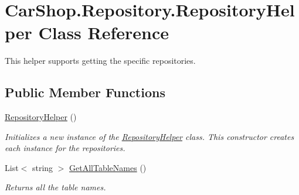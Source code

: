 \hypertarget{class_car_shop_1_1_repository_1_1_repository_helper}{}\section{Car\+Shop.\+Repository.\+Repository\+Helper Class Reference}
\label{class_car_shop_1_1_repository_1_1_repository_helper}


This helper supports getting the specific repositories.  


\subsection*{Public Member Functions}
\begin{DoxyCompactItemize}
\item 
\mbox{\hyperlink{class_car_shop_1_1_repository_1_1_repository_helper_ab5aa4d9a33d9b1859e1a4ab5aa4ab974}{Repository\+Helper}} ()
\begin{DoxyCompactList}\small\item\em Initializes a new instance of the \mbox{\hyperlink{class_car_shop_1_1_repository_1_1_repository_helper}{Repository\+Helper}} class. This constructor creates each instance for the repositories. \end{DoxyCompactList}\item 
List$<$ string $>$ \mbox{\hyperlink{class_car_shop_1_1_repository_1_1_repository_helper_abe7dec93c7555aa6630f7212ca2dd714}{Get\+All\+Table\+Names}} ()
\begin{DoxyCompactList}\small\item\em Returns all the table names. \end{DoxyCompactList}\end{DoxyCompactItemize}
